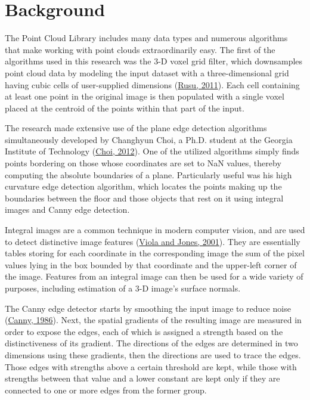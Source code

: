 \documentclass[12pt]{report}
\begin{document}
\section{Background}
The Point Cloud Library includes many data types and numerous algorithms that make working with point clouds extraordinarily easy.  The first of the algorithms used in this research was the 3-D voxel grid filter, which downsamples point cloud data by modeling the input dataset with a three-dimensional grid having cubic cells of user-supplied dimensions (\hyperref[bib:rusu]{Rusu, 2011}).  Each cell containing at least one point in the original image is then populated with a single voxel placed at the centroid of the points within that part of the input.

The research made extensive use of the plane edge detection algorithms simultaneously developed by Changhyun Choi, a Ph.D. student at the Georgia Institute of Technology (\hyperref[bib:choi]{Choi, 2012}).  One of the utilized algorithms simply finds points bordering on those whose coordinates are set to NaN values, thereby computing the absolute boundaries of a plane.  Particularly useful was his high curvature edge detection algorithm, which locates the points making up the boundaries between the floor and those objects that rest on it using integral images and Canny edge detection.

Integral images are a common technique in modern computer vision, and are used to detect distinctive image features (\hyperref[bib:viola]{Viola and Jones, 2001}).  They are essentially tables storing for each coordinate in the corresponding image the sum of the pixel values lying in the box bounded by that coordinate and the upper-left corner of the image.  Features from an integral image can then be used for a wide variety of purposes, including estimation of a 3-D image's surface normals.

The Canny edge detector starts by smoothing the input image to reduce noise (\hyperref[bib:canny]{Canny, 1986}).  Next, the spatial gradients of the resulting image are measured in order to expose the edges, each of which is assigned a strength based on the distinctiveness of its gradient.  The directions of the edges are determined in two dimensions using these gradients, then the directions are used to trace the edges.  Those edges with strengths above a certain threshold are kept, while those with strengths between that value and a lower constant are kept only if they are connected to one or more edges from the former group.
\end{document}

